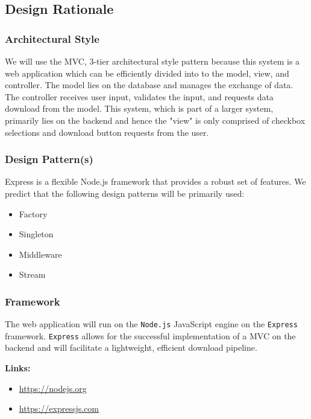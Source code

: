 \documentclass{article}
\begin{document}
\subsection{Design Rationale}

\subsubsection{Architectural Style}

We will use the MVC, 3-tier architectural style pattern because this system is a web application which can be efficiently divided into to the model, view, and controller. The model lies on the database and manages the exchange of data. The controller receives user input, validates the input, and requests data download from the model. This system, which is part of a larger system, primarily lies on the backend and hence the "view" is only comprised of checkbox selections and download button requests from the user. 

\subsubsection{Design Pattern(s)}

Express is a flexible Node.js framework that provides a robust set of features. We predict that the following design patterns will be primarily used: \\

\begin{itemize} 
	\item Factory
	\item Singleton
	\item Middleware
	\item Stream
\end{itemize}


\subsubsection{Framework}

The web application will run on the \texttt{Node.js} JavaScript engine on the \texttt{Express} framework. \texttt{Express} allows for the successful implementation of a MVC on the backend and will facilitate a lightweight, efficient download pipeline. 

\textbf{Links:}
\begin{itemize} 
	\item \url{https://nodejs.org}
	\item \url{https://expressjs.com}
\end{itemize}
\end{document}
